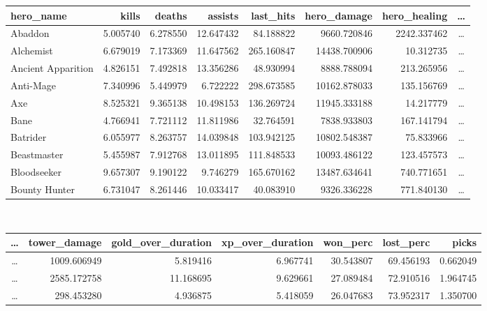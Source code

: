 \documentclass[a4paper,12pt,openany,oneside]{book}
\begin{document}
\begin{table}[H]
	\scriptsize	
	\centering	
	\begin{tabularx}{0.92\textwidth}{lrrrrrrc}
		hero\_name &    kills &   deaths &   assists &  last\_hits &  hero\_damage & hero\_healing & \dots \\
		\midrule
		Abaddon & 5.005740 & 6.278550 & 12.647432 &  84.188822 &             9660.720846  & 2242.337462 & \dots \\
		Alchemist & 6.679019 & 7.173369 & 11.647562 & 265.160847 &           14438.700906 & 10.312735   & \dots \\
		Ancient Apparition & 4.826151 & 7.492818 & 13.356286 &  48.930994 &  8888.788094  & 213.265956  & \dots \\
		Anti-Mage & 7.340996 & 5.449979 &  6.722222 & 298.673585 &           10162.878033 & 135.156769  & \dots \\
		Axe & 8.525321 & 9.365138 & 10.498153 & 136.269724 &                 11945.333188 & 14.217779   & \dots \\
		Bane & 4.766941 & 7.721112 & 11.811986 &  32.764591 &                7838.933803  & 167.141794  & \dots \\
		Batrider & 6.055977 & 8.263757 & 14.039848 & 103.942125 &            10802.548387 & 75.833966   & \dots \\
		Beastmaster & 5.455987 & 7.912768 & 13.011895 & 111.848533 &         10093.486122 & 123.457573  & \dots \\
		Bloodseeker & 9.657307 & 9.190122 &  9.746279 & 165.670162 &         13487.634641 & 740.771651  & \dots \\
		Bounty Hunter & 6.731047 & 8.261446 & 10.033417 &  40.083910 &       9326.336228  & 771.840130  & \dots \\
	\end{tabularx}
	\\[3.0em]
	\centering
	\begin{tabularx}{0.87\textwidth}{crrrrrr}
        \dots & tower\_damage & gold\_over\_duration & xp\_over\_duration &  won\_perc & lost\_perc & picks\\
        \midrule
        \dots &  1009.606949 &           5.819416 &         6.967741 & 30.543807 & 69.456193       & 0.662049 \\
        \dots &  2585.172758 &          11.168695 &         9.629661 & 27.089484 & 72.910516         & 1.964745 \\
        \dots &  298.453280 &           4.936875 &         5.418059 & 26.047683 & 73.952317        & 1.350700 \\

\end{tabularx}
\end{table}
\end{document}
